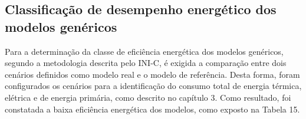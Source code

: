 \subsection{Classificação de desempenho energético dos modelos genéricos}
\noindent Para a determinação da classe de eficiência energética dos modelos genéricos, segundo a metodologia descrita pelo INI-C, é exigida a comparação entre dois cenários definidos como modelo real e o modelo de referência. Desta forma, foram configurados os cenários para a identificação do consumo total de energia térmica, elétrica e de energia primária, como descrito no capítulo 3. Como resultado, foi constatada a baixa eficiência energética dos modelos, como exposto na Tabela 15.
